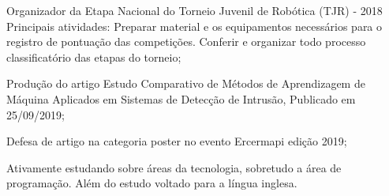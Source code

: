
\begin{zitemize}
\item Organizador da Etapa Nacional do Torneio Juvenil de Robótica (TJR) - 2018
Principais atividades: Preparar material e os equipamentos necessários para o
registro de pontuação das competições. Conferir e organizar todo processo
classificatório das etapas do torneio;
\end{zitemize}

\begin{zitemize}
\item Produção do artigo Estudo Comparativo de Métodos de Aprendizagem de
Máquina Aplicados em Sistemas de Detecção de Intrusão, Publicado em
25/09/2019;
\end{zitemize}


\begin{zitemize}
\item Defesa de artigo na categoria poster no evento Ercermapi edição 2019;
\end{zitemize}

\begin{zitemize}
\item Ativamente estudando sobre áreas da tecnologia, sobretudo a área de programação. Além do estudo voltado para a língua inglesa.
\end{zitemize}

